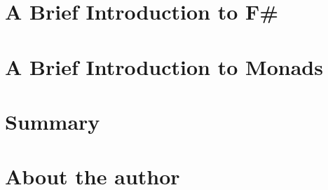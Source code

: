 \documentclass[12pt,american,VeneziaPhdThesis]{PhdThesis}%
\begin{document}
\chapter{A Brief Introduction to F\#}
\label{chap:fsharp}


\chapter{A Brief Introduction to Monads}
\label{chap:monads}


\backmatter

\chapter{Summary}
\label{chap:summary}


\chapter{About the author}
\label{chap:cv}

\end{document}

